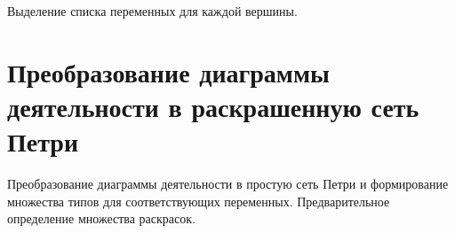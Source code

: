 \documentclass[12pt]{article}
\begin{document}
\begin{minipage}[H]{0.55\linewidth}
\end{minipage}
\hfill
\begin{minipage}[H]{0.44\linewidth}
Выделение списка переменных для каждой вершины.
\end{minipage}

\section{Преобразование диаграммы деятельности в раскрашенную сеть  Петри}

\begin{minipage}[H]{0.55\linewidth}
\end{minipage}
\hfill
\begin{minipage}[H]{0.44\linewidth}
Преобразование диаграммы деятельности в простую сеть Петри и формирование множества типов для соответствующих переменных. Предварительное определение множества раскрасок.
\end{minipage}
\end{document}
